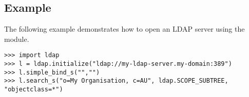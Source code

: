 
\subsection{Example \label{ldap-example}}

The following example demonstrates how to open an LDAP server using the
 module.

\begin{verbatim}
>>> import ldap
>>> l = ldap.initialize("ldap://my-ldap-server.my-domain:389")
>>> l.simple_bind_s("","")
>>> l.search_s("o=My Organisation, c=AU", ldap.SCOPE_SUBTREE, "objectclass=*")
\end{verbatim}


